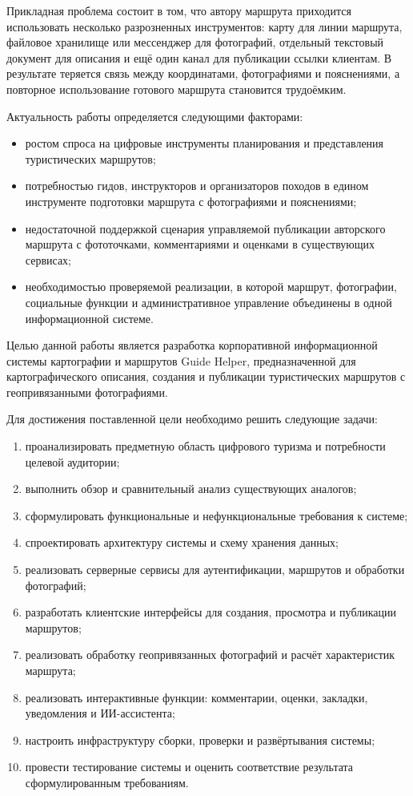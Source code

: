 Прикладная проблема состоит в том, что автору маршрута приходится использовать
несколько разрозненных инструментов: карту для линии маршрута, файловое хранилище
или мессенджер для фотографий, отдельный текстовый документ для описания и ещё
один канал для публикации ссылки клиентам. В результате теряется связь между
координатами, фотографиями и пояснениями, а повторное использование готового
маршрута становится трудоёмким.

Актуальность работы определяется следующими факторами:
\begin{itemize}
  \item ростом спроса на цифровые инструменты планирования и представления
    туристических маршрутов;
  \item потребностью гидов, инструкторов и организаторов походов в едином
    инструменте подготовки маршрута с фотографиями и пояснениями;
  \item недостаточной поддержкой сценария управляемой публикации авторского
    маршрута с фототочками, комментариями и оценками в существующих сервисах;
  \item необходимостью проверяемой реализации, в которой маршрут, фотографии,
    социальные функции и административное управление объединены в одной
    информационной системе.
\end{itemize}

Целью данной работы является разработка корпоративной информационной системы
картографии и маршрутов Guide Helper, предназначенной для картографического
описания, создания и публикации туристических маршрутов с геопривязанными
фотографиями.

Для достижения поставленной цели необходимо решить следующие задачи:
\begin{enumerate}
  \item проанализировать предметную область цифрового туризма и потребности
    целевой аудитории;
  \item выполнить обзор и сравнительный анализ существующих аналогов;
  \item сформулировать функциональные и нефункциональные требования к системе;
  \item спроектировать архитектуру системы и схему хранения данных;
  \item реализовать серверные сервисы для аутентификации, маршрутов и обработки
    фотографий;
  \item разработать клиентские интерфейсы для создания, просмотра и публикации
    маршрутов;
  \item реализовать обработку геопривязанных фотографий и расчёт характеристик
    маршрута;
  \item реализовать интерактивные функции: комментарии, оценки, закладки,
    уведомления и ИИ-ассистента;
  \item настроить инфраструктуру сборки, проверки и развёртывания системы;
  \item провести тестирование системы и оценить соответствие результата
    сформулированным требованиям.
\end{enumerate}

